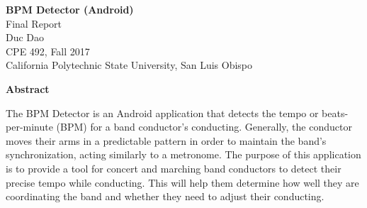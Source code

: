 \documentclass[12pt]{article}
\begin{document}
\begin{center}
  \vspace*{1in}
  \textbf{\LARGE{BPM Detector (Android)}} \\
  \large{Final Report \\
  Duc Dao \\
  CPE 492, Fall 2017 \\
  California Polytechnic State University, San Luis Obispo} \\
\end{center}

\begin{center}
  \vspace*{2in}
  \textbf{Abstract} \\
\end{center}
The BPM Detector is an Android application that detects the tempo or beats-per-minute (BPM) for a band conductor's conducting. Generally, the conductor moves their arms in a predictable pattern in order to maintain the band's synchronization, acting similarly to a metronome. The purpose of this application is to provide a tool for concert and marching band conductors to detect their precise tempo while conducting. This will help them determine how well they are coordinating the band and whether they need to adjust their conducting.  

\newpage

\tableofcontents

\newpage
\end{document}
